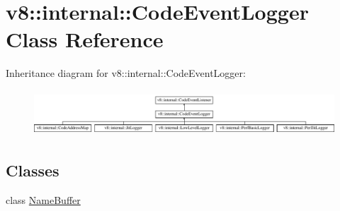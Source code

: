 \hypertarget{classv8_1_1internal_1_1CodeEventLogger}{}\section{v8\+:\+:internal\+:\+:Code\+Event\+Logger Class Reference}
\label{classv8_1_1internal_1_1CodeEventLogger}
Inheritance diagram for v8\+:\+:internal\+:\+:Code\+Event\+Logger\+:\begin{figure}[H]
\begin{center}
\leavevmode
\includegraphics[height=1.723077cm]{classv8_1_1internal_1_1CodeEventLogger}
\end{center}
\end{figure}
\subsection*{Classes}
\begin{DoxyCompactItemize}
\item 
class \mbox{\hyperlink{classv8_1_1internal_1_1CodeEventLogger_1_1NameBuffer}{Name\+Buffer}}
\end{DoxyCompactItemize}
